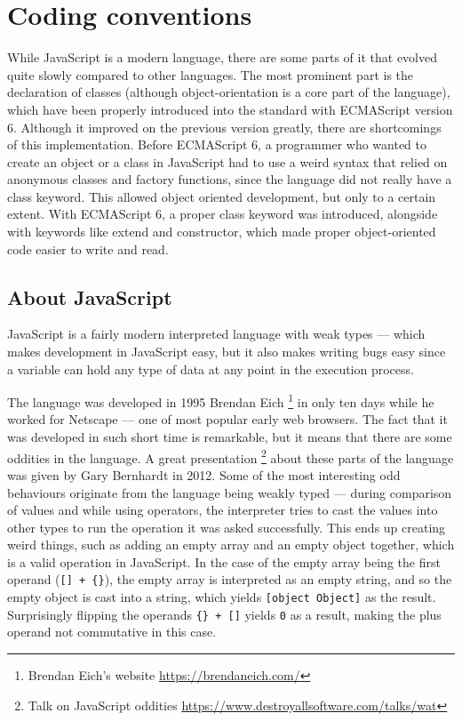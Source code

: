 \chapter{Coding conventions}
While JavaScript is a modern language, there are some parts of it that evolved quite slowly compared to other languages. The most prominent part is the declaration of classes (although object-orientation is a core part of the language), which have been properly introduced into the standard with ECMAScript version 6. Although it improved on the previous version greatly, there are shortcomings of this implementation. Before ECMAScript 6, a programmer who wanted to create an object or a class in JavaScript had to use a weird syntax that relied on anonymous classes and factory functions, since the language did not really have a class keyword. This allowed object oriented development, but only to a certain extent. With ECMAScript 6, a proper class keyword was introduced, alongside with keywords like extend and constructor, which made proper object-oriented code easier to write and read.
\section{About JavaScript}
JavaScript is a fairly modern interpreted language with weak types --- which makes development in JavaScript easy, but it also makes writing bugs easy since a variable can hold any type of data at any point in the execution process. 

The language was developed in 1995 Brendan Eich \footnote{Brendan Eich's website \url{https://brendaneich.com/}} in only ten days while he worked for Netscape --- one of most popular early web browsers. The fact that it was developed in such short time is remarkable, but it means that there are some oddities in the language. A great presentation \footnote{Talk on JavaScript oddities \url{https://www.destroyallsoftware.com/talks/wat}} about these parts of the language was given by Gary Bernhardt in 2012. Some of the most interesting odd behaviours originate from the language being weakly typed --- during comparison of values and while using operators, the interpreter tries to cast the values into other types to run the operation it was asked successfully. This ends up creating weird things, such as adding an empty array and an empty object together, which is a valid operation in JavaScript. In the case of the empty array being the first operand (\texttt{[] + \{\}}), the empty array is interpreted as an empty string, and so the empty object is cast into a string, which yields \texttt{[object Object]} as the result. Surprisingly flipping the operands \texttt{\{\} + []} yields \texttt{0} as a result, making the plus operand not commutative in this case.

